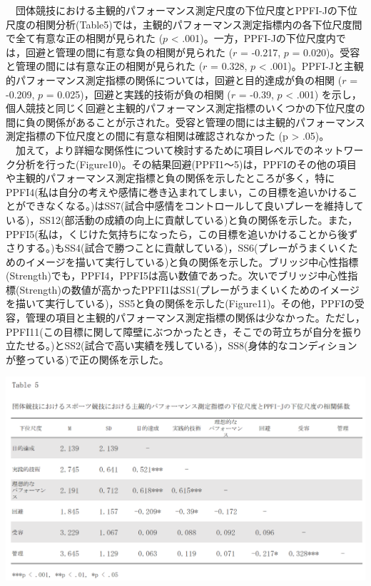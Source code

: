 \documentclass[12pt,a4paper,xelatex,ja=standard]{bxjsarticle}
\begin{document}
　団体競技における主観的パフォーマンス測定尺度の下位尺度とPPFI-Jの下位尺度の相関分析(Table5)では，主観的パフォーマンス測定指標内の各下位尺度間で全て有意な正の相関が見られた
(\(\mathit{p}\) \textless{}
.001)。一方，PPFI-Jの下位尺度内では，回避と管理の間に有意な負の相関が見られた
(\(\mathit{r}\) = -0.217, \(\mathit{p}\) =
0.020)。受容と管理の間には有意な正の相関が見られた (\(\mathit{r}\) =
0.328, \(\mathit{p}\) \textless{}
.001)。PPFI-Jと主観的パフォーマンス測定指標の関係については，回避と目的達成が負の相関
(\(\mathit{r}\) = -0.209, \(\mathit{p}\) =
0.025)，回避と実践的技術が負の相関 (\(\mathit{r}\) = -0.39,
\(\mathit{p}\) \textless{} .001)
を示し，個人競技と同じく回避と主観的パフォーマンス測定指標のいくつかの下位尺度の間に負の関係があることが示された。受容と管理の間には主観的パフォーマンス測定指標の下位尺度との間に有意な相関は確認されなかった
(p \textgreater{} .05)。\\
　加えて，より詳細な関係性について検討するために項目レベルでのネットワーク分析を行った(Figure10)。その結果回避(PPFI1～5)は，PPFIのその他の項目や主観的パフォーマンス測定指標と負の関係を示したところが多く，特にPPFI4(私は自分の考えや感情に巻き込まれてしまい，この目標を追いかけることができなくなる。)はSS7(試合中感情をコントロールして良いプレーを維持している)，SS12(部活動の成績の向上に貢献している)と負の関係を示した。また，PPFI5(私は，くじけた気持ちになったら，この目標を追いかけることから後ずさりする。)もSS4(試合で勝つことに貢献している)，SS6(プレーがうまくいくためのイメージを描いて実行している)と負の関係を示した。ブリッジ中心性指標(Strength)でも，PPFI4，PPFI5は高い数値であった。次いでブリッジ中心性指標(Strength)の数値が高かったPPFI1はSS1(プレーがうまくいくためのイメージを描いて実行している)，SS5と負の関係を示した(Figure11)。その他，PPFIの受容，管理の項目と主観的パフォーマンス測定指標の関係は少なかった。ただし，PPFI11(この目標に関して障壁にぶつかったとき，そこでの苛立ちが自分を振り立たせる。)とSS2(試合で高い実績を残している)，SS8(身体的なコンディションが整っている)で正の関係を示した。

\includegraphics{table5.png}
\end{document}
